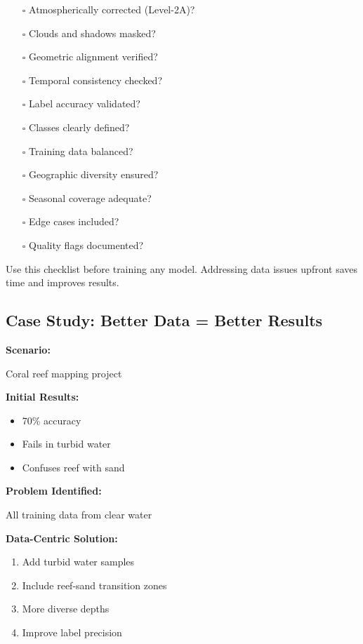 \documentclass[
  letterpaper,
  DIV=11,
  numbers=noendperiod]{scrartcl}
\providecommand{\tightlist}{%
  \setlength{\itemsep}{0pt}\setlength{\parskip}{0pt}}
\begin{document}
\begin{itemize}
\tightlist
\item[$\square$]
  Atmospherically corrected (Level-2A)?
\item[$\square$]
  Clouds and shadows masked?
\item[$\square$]
  Geometric alignment verified?
\item[$\square$]
  Temporal consistency checked?
\item[$\square$]
  Label accuracy validated?
\item[$\square$]
  Classes clearly defined?
\item[$\square$]
  Training data balanced?
\item[$\square$]
  Geographic diversity ensured?
\item[$\square$]
  Seasonal coverage adequate?
\item[$\square$]
  Edge cases included?
\item[$\square$]
  Quality flags documented?
\end{itemize}

Use this checklist before training any model. Addressing data issues
upfront saves time and improves results.

\subsection{Case Study: Better Data = Better
Results}\label{case-study-better-data-better-results}

\textbf{Scenario:}

Coral reef mapping project

\textbf{Initial Results:}

\begin{itemize}
\tightlist
\item
  70\% accuracy
\item
  Fails in turbid water
\item
  Confuses reef with sand
\end{itemize}

\textbf{Problem Identified:}

All training data from clear water

\textbf{Data-Centric Solution:}

\begin{enumerate}
\def\labelenumi{\arabic{enumi}.}
\tightlist
\item
  Add turbid water samples
\item
  Include reef-sand transition zones
\item
  More diverse depths
\item
  Improve label precision
\end{enumerate}
\end{document}
